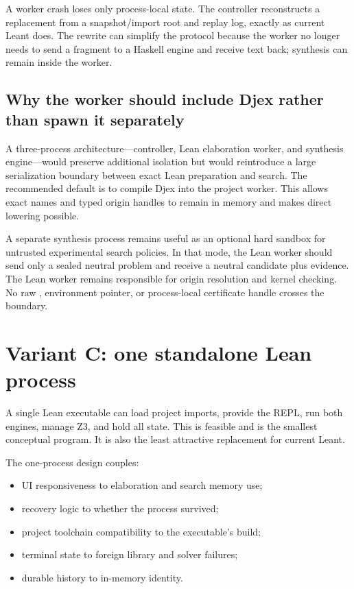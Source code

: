 \documentclass[10pt,letterpaper,oneside]{report}
\newcommand{\code}[1]{\texttt{\detokenize{#1}}}
\begin{document}
A worker crash loses only process-local state. The controller reconstructs a replacement from a snapshot/import root and replay log, exactly as current Leant does. The rewrite can simplify the protocol because the worker no longer needs to send a fragment to a Haskell engine and receive text back; synthesis can remain inside the worker.

\subsection{Why the worker should include Djex rather than spawn it separately}

A three-process architecture---controller, Lean elaboration worker, and synthesis engine---would preserve additional isolation but would reintroduce a large serialization boundary between exact Lean preparation and search. The recommended default is to compile Djex into the project worker. This allows exact names and typed origin handles to remain in memory and makes direct \code{Expr} lowering possible.

A separate synthesis process remains useful as an optional hard sandbox for untrusted experimental search policies. In that mode, the Lean worker should send only a sealed neutral problem and receive a neutral candidate plus evidence. The Lean worker remains responsible for origin resolution and kernel checking. No raw \code{Expr}, environment pointer, or process-local certificate handle crosses the boundary.

\section{Variant C: one standalone Lean process}

A single Lean executable can load project imports, provide the REPL, run both engines, manage Z3, and hold all state. This is feasible and is the smallest conceptual program. It is also the least attractive replacement for current Leant.

The one-process design couples:

\begin{itemize}
  \item UI responsiveness to elaboration and search memory use;
  \item recovery logic to whether the process survived;
  \item project toolchain compatibility to the executable's build;
  \item terminal state to foreign library and solver failures;
  \item durable history to in-memory \code{Environment} identity.
\end{itemize}
\end{document}
